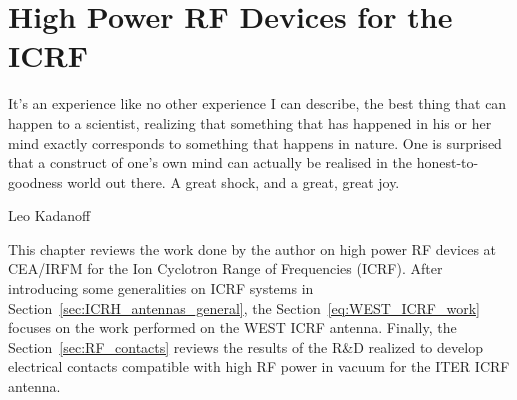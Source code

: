 \setchapterpreamble[u]{\margintoc}
\chapter[High Power RF Devices for the Ion Cyclotron Range of Frequencies]{High Power RF Devices for the ICRF}
\label{chap:ICRF}

\epigraph{It's an experience like no other experience I can describe, the best thing that can happen to a scientist, realizing that something that has happened in his or her mind exactly corresponds to something that happens in nature. One is surprised that a construct of one's own mind can actually be realised in the honest-to-goodness world out there. A great shock, and a great, great joy.}{Leo Kadanoff}


This chapter reviews the work done by the author on high power RF devices at CEA/IRFM for the Ion Cyclotron Range of Frequencies (ICRF).  After introducing some generalities on ICRF systems in Section~\ref{sec:ICRH_antennas_general}, the Section~\ref{eq:WEST_ICRF_work} focuses on the work performed on the WEST ICRF antenna. Finally, the Section~\ref{sec:RF_contacts} reviews the results of the R\&D realized to develop electrical contacts compatible with high RF power in vacuum for the ITER ICRF antenna. 


